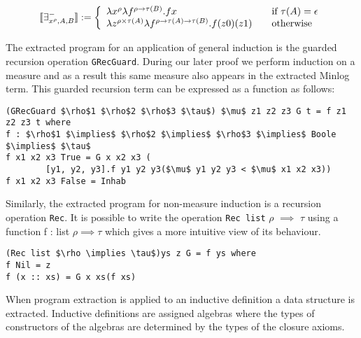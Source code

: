 \[ \llbracket \exists^{-}_{x^{\rho}, A, B} \rrbracket := \left\{ 
\begin{array}{l l}
\lambda x^{\rho} \lambda f^{\rho \to \tau (B)}. f x  & \quad \text{if $\tau (A) = \epsilon$} \\ 
\lambda z^{\rho \times \tau (A)} \lambda f^{\rho \to \tau (A) \to \tau (B)}. f
(z0) (z1) & \quad \text{otherwise} \\

\end{array} \right.
\]

The extracted program for an application of general induction is the guarded recursion operation \texttt{GRecGuard}. During our later proof we perform induction on a measure and as a result this same measure also appears in the extracted Minlog term.  This guarded recursion term can be expressed as a function as follows:

\begin{lstlisting}[caption = The Guarded Recursion Operation Used in the Minlog System, mathescape]
(GRecGuard $\rho$1 $\rho$2 $\rho$3 $\tau$) $\mu$ z1 z2 z3 G t = f z1 z2 z3 t where
f : $\rho$1 $\implies$ $\rho$2 $\implies$ $\rho$3 $\implies$ Boole $\implies$ $\tau$
f x1 x2 x3 True = G x x2 x3 (
        [y1, y2, y3].f y1 y2 y3($\mu$ y1 y2 y3 < $\mu$ x1 x2 x3))
f x1 x2 x3 False = Inhab
\end{lstlisting}


Similarly, the extracted program for non-measure induction is a recursion operation \texttt{Rec}. It is possible to write the operation \texttt{Rec list} $\rho$ $\implies$ $\tau$ using a function
f : list $\rho \implies \tau$ which gives a more intuitive view of its behaviour.
\begin{lstlisting}[caption = The Recursion Operation Used in the Minlog System ,mathescape]
(Rec list $\rho \implies \tau$)ys z G = f ys where
f Nil = z
f (x :: xs) = G x xs(f xs)
\end{lstlisting}


When program extraction is applied to an inductive definition a data structure is extracted. Inductive definitions are assigned algebras 
where the types of constructors of the algebras are determined by the types of the closure axioms.
